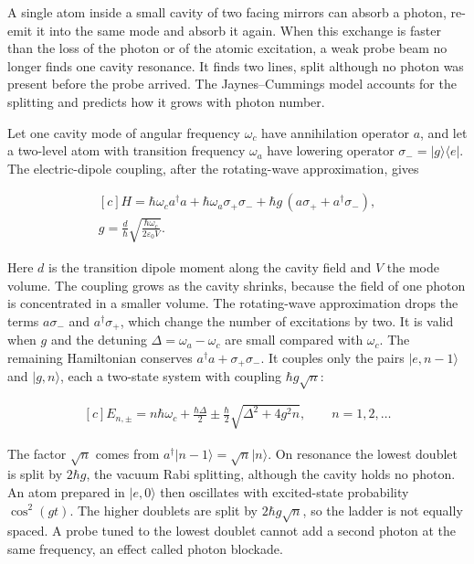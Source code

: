 \documentclass[11pt,oneside]{book}
\newenvironment{centeredalign}{\[\begin{gathered}[c]}{\end{gathered}\]}
\newcommand{\ket}[1]{\lvert #1\rangle}
\newcommand{\bra}[1]{\langle #1\rvert}
\begin{document}
\label{topic:quantum-optics}

A single atom inside a small cavity of two facing mirrors can absorb a photon, re-emit it into the same mode and absorb it again. When this exchange is faster than the loss of the photon or of the atomic excitation, a weak probe beam no longer finds one cavity resonance. It finds two lines, split although no photon was present before the probe arrived. The Jaynes--Cummings model accounts for the splitting and predicts how it grows with photon number.

Let one cavity mode of angular frequency \(\omega_c\) have annihilation operator \(a\), and let a two-level atom with transition frequency \(\omega_a\) have lowering operator \(\sigma_-=\ket{g}\bra{e}\). The electric-dipole coupling, after the rotating-wave approximation, gives

\begin{centeredalign}
H=\hbar\omega_c a^\dagger a+\hbar\omega_a\sigma_+\sigma_-
+\hbar g\,(a\sigma_++a^\dagger\sigma_-),\\
g=\frac{d}{\hbar}\sqrt{\frac{\hbar\omega_c}{2\varepsilon_0V}}.
\end{centeredalign}

Here \(d\) is the transition dipole moment along the cavity field and \(V\) the mode volume. The coupling grows as the cavity shrinks, because the field of one photon is concentrated in a smaller volume. The rotating-wave approximation drops the terms \(a\sigma_-\) and \(a^\dagger\sigma_+\), which change the number of excitations by two. It is valid when \(g\) and the detuning \(\Delta=\omega_a-\omega_c\) are small compared with \(\omega_c\). The remaining Hamiltonian conserves \(a^\dagger a+\sigma_+\sigma_-\). It couples only the pairs \(\ket{e,n-1}\) and \(\ket{g,n}\), each a two-state system with coupling \(\hbar g\sqrt n\):

\begin{centeredalign}
E_{n,\pm}=n\hbar\omega_c+\frac{\hbar\Delta}{2}\pm\frac{\hbar}{2}\sqrt{\Delta^2+4g^2n},
\qquad n=1,2,\dots
\end{centeredalign}

The factor \(\sqrt n\) comes from \(a^\dagger\ket{n-1}=\sqrt n\ket{n}\). On resonance the lowest doublet is split by \(2\hbar g\), the vacuum Rabi splitting, although the cavity holds no photon. An atom prepared in \(\ket{e,0}\) then oscillates with excited-state probability \(\cos^2(gt)\). The higher doublets are split by \(2\hbar g\sqrt n\), so the ladder is not equally spaced. A probe tuned to the lowest doublet cannot add a second photon at the same frequency, an effect called photon blockade.
\end{document}
